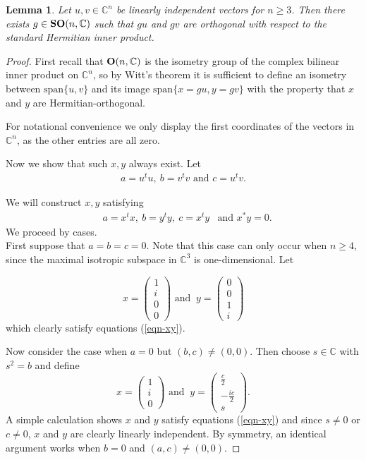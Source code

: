 \documentclass[11pt,reqno]{amsart}
\theoremstyle{plain}
\newtheorem{lemma}        [theorem]  {Lemma}
\theoremstyle{definition}
\numberwithin{equation}{section}
\def \cn{{\mathbb C}}
\def \SOC#1{\text{\bf SO}(#1,\cn)}
\def \OC#1{\text{\bf O}(#1,\cn)}
\numberwithin{equation}{section}
\begin{document}
\begin{lemma}\label{lemma-zeros-sonC}
	Let $u,v \in \mathbb{C}^n$ be linearly independent vectors for $n \geq 3$. Then there exists $g \in \SOC{n}$ such that $gu$ and $gv$ are orthogonal with respect to the standard Hermitian inner product.\end{lemma} 
\begin{proof}
	First recall that $\OC{n}$ is the isometry group of the complex bilinear inner product on $\cn^n$, so by Witt's theorem it is sufficient to define an isometry between $\text{span}\{u,v\}$ and its image $\text{span}\{x=gu,y=gv\}$ with the property that $x$ and $y$ are Hermitian-orthogonal.	
	
	 For notational convenience we only display the first coordinates of the vectors in $\cn^n$, as the other entries are all zero.
	 
	Now we show that such $x,y$ always exist. Let 
	\begin{eqnarray*}
		&a = u^t u, \ b = v^t v \text{ and } c = u^t v.&
	\end{eqnarray*}
	
	We will construct $x,y$ satisfying
	\begin{eqnarray}\label{eqn-xy}
		&a = x^t x, \ b = y^t y, \ c = x^t y& \text{and } x^*y=0.
	\end{eqnarray}
	We proceed by cases. \\

	
	First suppose that $a = b =c = 0$. Note that this case can only occur when $n \geq 4$, since the maximal isotropic subspace in $\cn^3$ is one-dimensional. Let

$$ x = \begin{pmatrix}
		1 \\ i \\ 0 \\ 0
	\end{pmatrix} \text{ and }  \ y = \begin{pmatrix}
		0 \\ 0 \\ 1 \\ i
	\end{pmatrix}$$
	which clearly satisfy equations (\ref{eqn-xy}).
	
	Now consider the case when $a = 0$ but $(b,c) \neq (0,0)$. Then choose $s \in \cn$ with $s^2=b$ and define
	$$ x = \begin{pmatrix}
		1 \\ i \\ 0
	\end{pmatrix} \text{ and }  \ y = \begin{pmatrix}
		\tfrac{c}{2} \\ -\tfrac{ic}{2}\\ s
	\end{pmatrix}.$$
A simple calculation shows $x$ and $y$ satisfy equations (\ref{eqn-xy}) and since $s \neq 0$ or $c \neq 0$, $x$ and $y$ are clearly linearly independent. By symmetry, an identical argument works when $b=0$ and $(a,c) \neq (0,0)$.


\end{proof}
\end{document}
